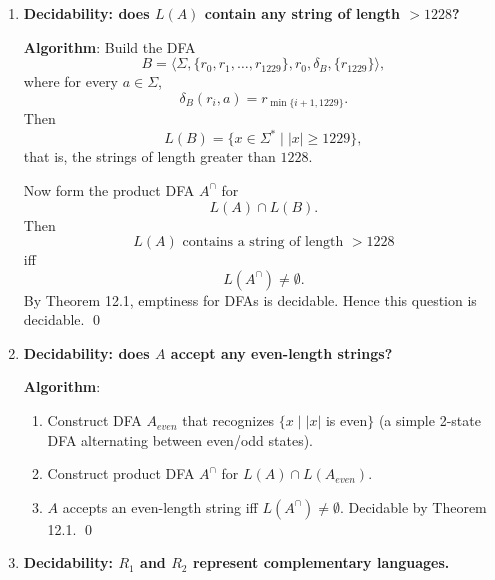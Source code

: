 \begin{enumerate}[{12.}1. ]
$L(A)$ is cofinite iff $\overline{L(A)}$ is finite.

\textbf{Algorithm}:
\begin{enumerate}
\item Construct DFA $A^c$ for $\overline{L(A)}$ (complement).
\item $\overline{L(A)}$ is finite iff $L(A^c)$ is finite iff the DFA $A^c$ (after removing unreachable states) has no cycle reachable from the start state that also leads to a final state (Theorem 12.2 analog).
\item Check for cycles in $A^c$ among useful states (BFS/DFS). Decidable. \qed
\end{enumerate}

\item \textbf{Decidability: does $L(A)$ contain any string of length $> 1228$?}

\textbf{Algorithm}: Build the DFA
\[
B=\langle \Sigma,\{r_0,r_1,\ldots,r_{1229}\},r_0,\delta_B,\{r_{1229}\}\rangle,
\]
where for every $a\in\Sigma$,
\[
\delta_B(r_i,a)=r_{\min\{i+1,1229\}}.
\]
Then
\[
L(B)=\{x\in\Sigma^*\mid |x|\geq 1229\},
\]
that is, the strings of length greater than $1228$.

Now form the product DFA $A^\cap$ for
\[
L(A)\cap L(B).
\]
Then
\[
L(A)\text{ contains a string of length }>1228
\]
iff
\[
L(A^\cap)\neq\emptyset.
\]
By Theorem 12.1, emptiness for DFAs is decidable. Hence this question is
decidable. \qed

\item \textbf{Decidability: does $A$ accept any even-length strings?}

\textbf{Algorithm}:
\begin{enumerate}
\item Construct DFA $A_{even}$ that recognizes $\{x \mid |x|$ is even$\}$ (a simple 2-state DFA alternating between even/odd states).
\item Construct product DFA $A^\cap$ for $L(A)\cap L(A_{even})$.
\item $A$ accepts an even-length string iff $L(A^\cap)\neq\emptyset$. Decidable by Theorem 12.1. \qed
\end{enumerate}

\item \textbf{Decidability: $R_1$ and $R_2$ represent complementary languages.}


\end{enumerate}
